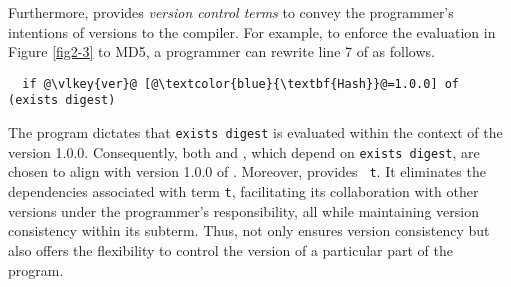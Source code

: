 Furthermore, \mylang{} provides \emph{version control terms} to convey the programmer's intentions of versions to the compiler. For example, to enforce the evaluation in Figure \ref{fig2-3} to MD5, a programmer can rewrite line 7 of  as follows.

\begin{verbatim}
  if @\vlkey{ver}@ [@\textcolor{blue}{\textbf{Hash}}@=1.0.0] of (exists digest)
\end{verbatim}
The program dictates that \texttt{exists digest} is evaluated within the context of the  version 1.0.0. Consequently, both  and , which depend on \texttt{exists digest}, are chosen to align with version 1.0.0 of .
Moreover, \mylang{} provides \texttt{ t}. It eliminates the dependencies associated with term \texttt{t}, facilitating its collaboration with other versions under the programmer's responsibility, all while maintaining version consistency within its subterm.
Thus, \mylang{} not only ensures version consistency but also offers the flexibility to control the version of a particular part of the program.


